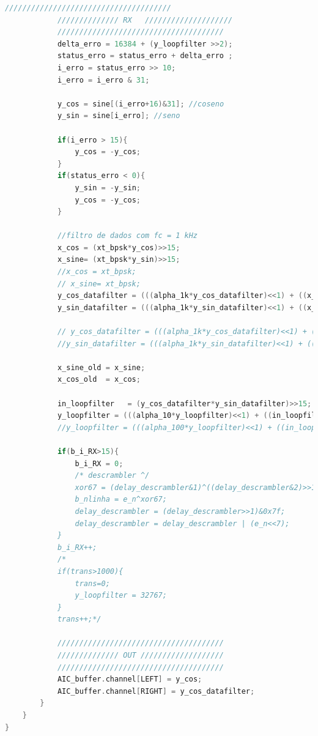 \documentclass[11pt]{article}
\numberwithin{equation}{section}
\begin{document}
\begin{lstlisting}[language=C]
			//////////////////////////////////////
			////////////// RX	////////////////////
			//////////////////////////////////////	
			delta_erro = 16384 + (y_loopfilter >>2);
			status_erro = status_erro + delta_erro ;
			i_erro = status_erro >> 10;
			i_erro = i_erro & 31;
			
			y_cos = sine[(i_erro+16)&31]; //coseno
			y_sin = sine[i_erro]; //seno
			
			if(i_erro > 15){
				y_cos = -y_cos;
			}
			if(status_erro < 0){
				y_sin = -y_sin;
				y_cos = -y_cos;
			}
			
			//filtro de dados com fc = 1 kHz
			x_cos = (xt_bpsk*y_cos)>>15;
			x_sine= (xt_bpsk*y_sin)>>15;
			//x_cos = xt_bpsk;
			// x_sine= xt_bpsk;
			y_cos_datafilter = (((alpha_1k*y_cos_datafilter)<<1) + ((x_cos*um_menos_alpha_1k)<<1))>>16;/*Filtro sem zero em ws/2*/
			y_sin_datafilter = (((alpha_1k*y_sin_datafilter)<<1) + ((x_sine*um_menos_alpha_1k)<<1))>>16;/*Filtro sem zero em ws/2*/
			
			// y_cos_datafilter = (((alpha_1k*y_cos_datafilter)<<1) + ((((x_cos + x_cos_old)*um_menos_alpha_1k)>>1)<<1))>>16;/*Filtro com zero em ws/2*/
			//y_sin_datafilter = (((alpha_1k*y_sin_datafilter)<<1) + ((((x_sine + x_sine_old)*um_menos_alpha_1k)>>1)<<1))>>16;/*Filtro com zero em ws/2*/
			
			x_sine_old = x_sine;
			x_cos_old  = x_cos;
			
			in_loopfilter	= (y_cos_datafilter*y_sin_datafilter)>>15;
			y_loopfilter = (((alpha_10*y_loopfilter)<<1) + ((in_loopfilter*um_menos_alpha_10)<<1))>>16;
			//y_loopfilter = (((alpha_100*y_loopfilter)<<1) + ((in_loopfilter*um_menos_alpha_100)<<1))>>16;
			
			if(b_i_RX>15){
				b_i_RX = 0;
				/* descrambler ^/
				xor67 = (delay_descrambler&1)^((delay_descrambler&2)>>1);
				b_nlinha = e_n^xor67;
				delay_descrambler = (delay_descrambler>>1)&0x7f;
				delay_descrambler = delay_descrambler | (e_n<<7);
			}
			b_i_RX++;
			/*
			if(trans>1000){
				trans=0;
				y_loopfilter = 32767;
			}
			trans++;*/
			
			//////////////////////////////////////
			////////////// OUT ///////////////////
			//////////////////////////////////////
			AIC_buffer.channel[LEFT] = y_cos;
			AIC_buffer.channel[RIGHT] = y_cos_datafilter;		
		}
	}
}
\end{lstlisting}
\end{document}
